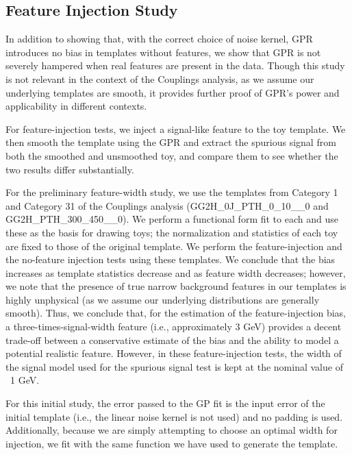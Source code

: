 \clearpage


\subsection{Feature Injection Study}

In addition to showing that, with the correct choice of noise kernel, GPR introduces no bias in templates without features, we show that GPR is not severely hampered when real features are present in the data. Though this study is not relevant in the context of the Couplings analysis, as we assume our underlying templates are smooth, it provides further proof of GPR's power and applicability in different contexts.

For feature-injection tests, we inject a signal-like feature to the toy template. We then smooth the template using the GPR and extract the spurious signal from both the smoothed and unsmoothed toy, and compare them to see whether the two results differ substantially.

For the preliminary feature-width study, we use the templates from Category 1 and Category 31 of the Couplings analysis (GG2H\_0J\_PTH\_0\_10\_\_0 and GG2H\_PTH\_300\_450\_\_0). We perform a functional form fit to each and use these as the basis for drawing toys; the normalization and statistics of each toy are fixed to those of the original template. We perform the feature-injection and the no-feature injection tests using these templates. We conclude that the bias increases as template statistics decrease and as feature width decreases; however, we note that the presence of true narrow background features in our templates is highly unphysical (as we assume our underlying distributions are generally smooth). Thus, we conclude that, for the estimation of the feature-injection bias, a three-times-signal-width feature (i.e., approximately 3 GeV) provides a decent trade-off between a conservative estimate of the bias and the ability to model a potential realistic feature. However, in these feature-injection tests, the width of the signal model used for the spurious signal test is kept at the nominal value of ~1 GeV.

For this initial study, the error passed to the GP fit is the input error of the initial template (i.e., the linear noise kernel is not used) and no padding is used. Additionally, because we are simply attempting to choose an optimal width for injection, we fit with the same function we have used to generate the template. 

